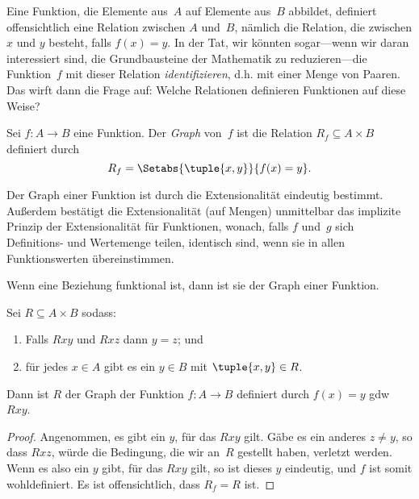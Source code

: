 \documentclass[../../../include/open-logic-section]{subfiles}
\begin{document}


\begin{explain} 
Eine Funktion, die Elemente aus~$A$ auf Elemente aus~$B$ abbildet,
definiert offensichtlich eine Relation zwischen $A$ und~$B$, nämlich die Relation,
die zwischen $x$ und $y$ besteht, falls $f(x) = y$.  In der Tat, wir könnten
sogar---wenn wir daran interessiert sind, die Grundbausteine der
Mathematik zu reduzieren---die Funktion~$f$ mit dieser Relation \emph{identifizieren},
d.h. mit einer Menge von Paaren. Das wirft dann die Frage auf:
Welche Relationen definieren Funktionen auf diese Weise?
\end{explain}

\begin{defn} Sei $f\colon A \to B$ eine Funktion.
Der \emph{Graph} von~$f$ ist die Relation $R_f \subseteq A \times B$
definiert durch
\[
R_f = \Setabs{\tuple{x,y}}{f(x) = y}.
\]
\end{defn}

\begin{explain}
Der Graph einer Funktion ist durch die Extensionalität eindeutig bestimmt.
Außerdem bestätigt die Extensionalität (auf Mengen) unmittelbar das
implizite Prinzip der Extensionalität für Funktionen,
wonach, falls $f$ und~$g$ sich Definitions- und Wertemenge teilen, identisch sind,
wenn sie in allen Funktionswerten übereinstimmen. 

Wenn eine Beziehung \glqq funktional\grqq{} ist, dann ist sie der Graph einer Funktion. 
\end{explain}

\begin{prop}
Sei $R \subseteq A \times B$ sodass:
\begin{enumerate}
\item Falls $Rxy$ und $Rxz$ dann $y = z$; und 
\item für jedes $x \in A$ gibt es ein $y \in B$ mit $\tuple{x,
y} \in R$.  
\end{enumerate}
Dann ist $R$ der Graph der Funktion $f\colon A \to B$ definiert durch
$f(x) = y$ gdw $Rxy$. 
\end{prop}

\begin{proof}
Angenommen, es gibt ein $y$, für das $Rxy$ gilt.  Gäbe es ein anderes $z \neq
y$, so dass $Rxz$, würde die Bedingung, die wir an~$R$ gestellt haben, verletzt werden. Wenn es
also ein $y$ gibt, für das $Rxy$ gilt, so ist dieses $y$ eindeutig, und $f$ ist somit
wohldefiniert.  Es ist offensichtlich, dass $R_f = R$ ist.
\end{proof}
\end{document}
